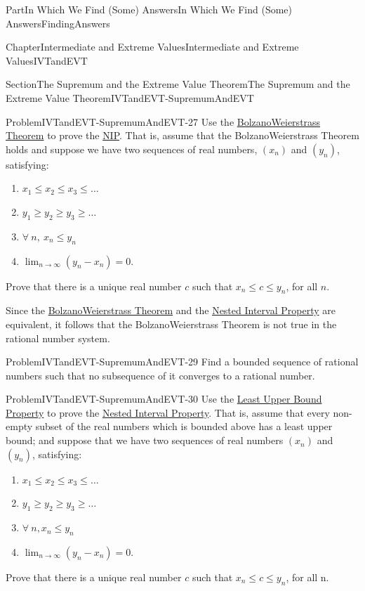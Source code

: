 \documentclass[oneside,10pt,]{book}
\numberwithin{equation}{part}
\def\limit#1#2#3{{\displaystyle\lim_{#1\rightarrow #2}#3}}
\begin{document}
\begin{partptx}{Part}{In Which We Find (Some) Answers}{}{In Which We Find (Some) Answers}{}{}{FindingAnswers}
\begin{chapterptx}{Chapter}{Intermediate and Extreme Values}{}{Intermediate and Extreme Values}{}{}{IVTandEVT}
\begin{sectionptx}{Section}{The Supremum and the Extreme Value Theorem}{}{The Supremum and the Extreme Value Theorem}{}{}{IVTandEVT-SupremumAndEVT}
\begin{problem}{Problem}{}{IVTandEVT-SupremumAndEVT-27}%
Use the \hyperref[BolzanoWeierstrass]{Bolzano\textendash{}Weierstrass Theorem} to prove the \hyperref[NIP]{NIP}. That is, assume that the Bolzano\textendash{}Weierstrass Theorem holds and suppose we have two sequences of real numbers, \(\left(x_n\right)\) and \(\left(y_n\right)\), satisfying:%
\begin{enumerate}
\item{}\(\displaystyle x_1\le x_2 \le x_3 \le \ldots\)%
\item{}\(\displaystyle y_1\ge y_2 \ge y_3 \ge \ldots\)%
\item{}\(\displaystyle \forall\ n,\ x_n\le y_n\)%
\item{}\(\limit{n}{\infty}{\left(y_n-x_n\right)} = 0\).%
\end{enumerate}
%
\par
Prove that there is a unique real number \(c\) such that \(x_n\le c\le y_n\), for all \(n\).%
\end{problem}
Since the \hyperref[BolzanoWeierstrass]{Bolzano\textendash{}Weierstrass Theorem} and the \hyperref[NIP]{Nested Interval Property} are equivalent, it follows that the Bolzano\textendash{}Weierstrass Theorem is not true in the rational number system.%
\begin{problem}{Problem}{}{IVTandEVT-SupremumAndEVT-29}%
Find a bounded sequence of rational numbers such that no subsequence of it converges to a rational number.%
\end{problem}
\begin{problem}{Problem}{}{IVTandEVT-SupremumAndEVT-30}%
Use the \hyperref[thm_LUB]{Least Upper Bound Property} to prove the \hyperref[NIP]{Nested Interval Property}. That is, assume that every non-empty subset of the real numbers which is bounded above has a least upper bound; and suppose that we have two sequences of real numbers \(\left(x_n\right)\) and \(\left(y_n\right)\), satisfying:%
\begin{enumerate}
\item{}\(\displaystyle x_1\le x_2 \le x_3 \le \ldots\)%
\item{}\(\displaystyle y_1\ge y_2 \ge y_3 \ge \ldots\)%
\item{}\(\displaystyle \forall\ n, x_n\le y_n\)%
\item{}\(\limit{n}{\infty}{\left(y_n-x_n\right)} = 0\).%
\end{enumerate}
%
\par
Prove that there is a unique real number \(c\) such that \(x_n\le c\le y_n\), for all n.%

\end{problem}
\end{sectionptx}
\end{chapterptx}
\end{partptx}
\end{document}
